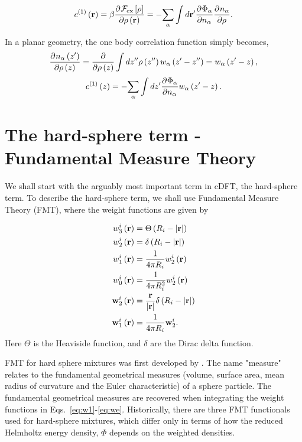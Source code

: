 \documentclass[12pt, letterpaper]{article}
\newcommand*{\pd}[3][]{\frac{\partial^{#1}#2}{\partial{#3}^{#1}}}%
\newcommand*{\abs}[1]{\lvert#1\rvert}
\newcommand*{\lb}{\ensuremath{\left(}}
\newcommand*{\rb}{\ensuremath{\right)}}
\newcommand*{\lbf}{\ensuremath{\left[}}
\newcommand*{\rbf}{\ensuremath{\right]}}
\newcommand{\excess}{\ensuremath{\text{ex}}\xspace}
\begin{document}
\begin{equation}
  c^{(1)}\lb \mathbf{r} \rb = \beta \pd{\mathcal{F}_{\excess} \lbf \rho \rbf}{\rho \lb \mathbf{r} \rb} =  -\underset{\alpha}{\sum} \int d \mathbf{r}^\prime \pd{\Phi_\alpha}{n_\alpha} \pd{n_\alpha}{\rho}.
\end{equation}

In a planar geometry, the one body correlation function simply becomes,
\begin{equation}
  \label{eq:dndrho}
  \pd{n_\alpha \lb z^\prime \rb}{\rho \lb z \rb} = \frac{\partial}{\partial \rho \lb z \rb} \int dz^{\prime\prime} \rho \lb z^{\prime\prime} \rb w_\alpha \lb z^\prime - z^{\prime\prime} \rb = w_\alpha \lb z^\prime - z\rb,
\end{equation}
\begin{equation}
  \label{eq:c1_1d}
  c^{(1)}\lb z \rb = -\underset{\alpha}{\sum} \int d z^\prime \pd{\Phi_\alpha}{n_\alpha} w_\alpha \lb z^\prime - z\rb.
\end{equation}


\section{The hard-sphere term - Fundamental Measure Theory}
We shall start with the arguably most important term in cDFT, the hard-sphere term. To describe the hard-sphere term, we shall use Fundamental Measure Theory (FMT), where the weight functions are given by

\begin{align}
  w_3^i \lb \mathbf{r} \rb &=  \Theta \lb R_i - \abs{\mathbf{r}} \rb \label{eq:w1} \\
  w_2^i \lb \mathbf{r} \rb &=  \delta \lb R_i - \abs{\mathbf{r}} \rb \\
  w_1^i \lb \mathbf{r} \rb &= \frac{1}{4 \pi R_i} w_2^i \lb \mathbf{r} \rb \\
  w_0^i \lb \mathbf{r} \rb &= \frac{1}{4 \pi R_i^2} w_2^i \lb \mathbf{r} \rb \\
  \mathbf{w}_2^i \lb \mathbf{r} \rb &=  \frac{\mathbf{r}}{\abs{\mathbf{r}}}\delta \lb R_i - \abs{\mathbf{r}} \rb \\
  \mathbf{w}_1^i \lb \mathbf{r} \rb &= \frac{1}{4 \pi R_i} \mathbf{w}_2^i.\label{eq:we}
\end{align}
Here $\Theta$ is the Heaviside function, and $\delta$ are the Dirac delta function.

FMT for hard sphere mixtures was first developed by
\citet{rosenfeld1989}. The name "measure" relates to the fundamental
geometrical measures (volume, surface area, mean radius of curvature
and the Euler characteristic) of a sphere particle. The fundamental
geometrical measures are recovered when integrating the weight
functions in Eqs.~\ref{eq:w1}-\ref{eq:we}. Historically, there are
three FMT functionals used for hard-sphere mixtures, which differ only
in terms of how the reduced Helmholtz energy density, $\Phi$ depends
on the weighted densities.
\end{document}
